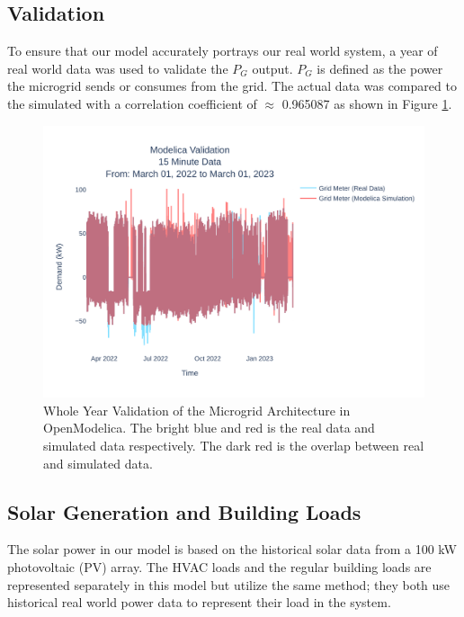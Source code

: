\documentclass[conference]{IEEEtran}
\begin{document}
	\subsection{Validation}
		To ensure that our model accurately portrays our real world system, a year of real world data was used to validate the $P_G $ output. $P_G$ is defined as the power the microgrid sends or consumes from the grid.  The actual data was compared to the simulated  with a correlation coefficient of  $\approx$ 0.965087 as shown in Figure \ref{fig:ucr15minutedatamar012022tomar012023}. 
		\begin{figure}
			\centering
			\includegraphics[width=0.9\linewidth]{Fig/ucr_15_Minute_Data_Mar_01_2022_to_Mar_01_2023}
			\caption{\footnotesize Whole Year Validation of the Microgrid Architecture in OpenModelica. The bright blue and red is the real data and simulated data respectively. The dark red is the overlap between real and simulated data.} %
			\label{fig:ucr15minutedatamar012022tomar012023}
		\end{figure}
    \subsection{Solar Generation and Building Loads}
    	The solar power in our model is based on the historical solar data from a 100 kW  photovoltaic (PV) array. The HVAC loads and the regular building loads are represented separately in this model but utilize the same method; they both use historical real world power data to represent their load in the system. 
\end{document}

